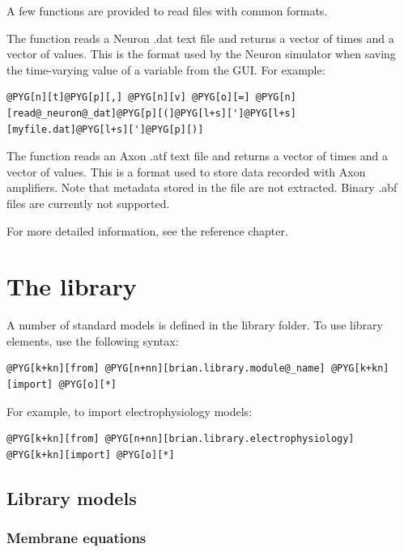 \documentclass[letterpaper,10pt,english]{manual}
\begin{document}
A few functions are provided to read files with common formats.

The function  reads a Neuron .dat text file
and returns a vector of times and a vector of values. This is the format
used by the Neuron simulator when saving the time-varying value of a variable
from the GUI. For example:

\begin{Verbatim}[commandchars=@\[\]]
@PYG[n][t]@PYG[p][,] @PYG[n][v] @PYG[o][=] @PYG[n][read@_neuron@_dat]@PYG[p][(]@PYG[l+s][']@PYG[l+s][myfile.dat]@PYG[l+s][']@PYG[p][)]
\end{Verbatim}

The function  reads an Axon .atf text file and
returns a vector of times and a vector of values. This is a format used
to store data recorded with Axon amplifiers. Note that
metadata stored in the file are not extracted.
Binary .abf files are currently not supported.

For more detailed information, see the reference chapter.

\resetcurrentobjects
\hypertarget{--doc-library}{}

\chapter{The library}

A number of standard models is defined in the library folder. To use library elements, use the following syntax:

\begin{Verbatim}[commandchars=@\[\]]
@PYG[k+kn][from] @PYG[n+nn][brian.library.module@_name] @PYG[k+kn][import] @PYG[o][*]
\end{Verbatim}

For example, to import electrophysiology models:

\begin{Verbatim}[commandchars=@\[\]]
@PYG[k+kn][from] @PYG[n+nn][brian.library.electrophysiology] @PYG[k+kn][import] @PYG[o][*]
\end{Verbatim}

\resetcurrentobjects
\hypertarget{--doc-librarymodels}{}

\section{Library models}


\subsection{Membrane equations}
\end{document}
